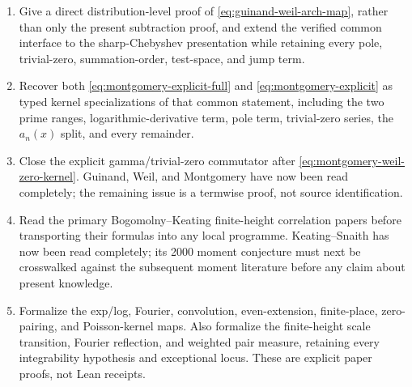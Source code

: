 \begin{enumerate}
  \item Give a direct distribution-level proof of
  \eqref{eq:guinand-weil-arch-map}, rather than only the present subtraction proof, and extend
  the verified common interface to the sharp-Chebyshev presentation while retaining every
  pole, trivial-zero, summation-order, test-space, and jump term.
  \item Recover both \eqref{eq:montgomery-explicit-full} and
  \eqref{eq:montgomery-explicit} as typed kernel specializations of that common statement,
  including the two prime ranges, logarithmic-derivative term, pole term, trivial-zero
  series, the $a_n(x)$ split, and every remainder.
  \item Close the explicit gamma/trivial-zero commutator after
  \eqref{eq:montgomery-weil-zero-kernel}.  Guinand, Weil, and Montgomery have now been read
  completely; the remaining issue is a termwise proof, not source identification.
  \item Read the primary Bogomolny--Keating finite-height correlation papers before
  transporting their formulas into any local programme.  Keating--Snaith has now been read
  completely; its 2000 moment conjecture must next be crosswalked against the subsequent
  moment literature before any claim about present knowledge.
  \item Formalize the exp/log, Fourier, convolution, even-extension, finite-place,
  zero-pairing, and Poisson-kernel maps.  Also formalize the finite-height scale transition,
  Fourier reflection, and weighted pair measure, retaining every integrability hypothesis and
  exceptional locus.  These are explicit paper proofs, not Lean receipts.
\end{enumerate}
